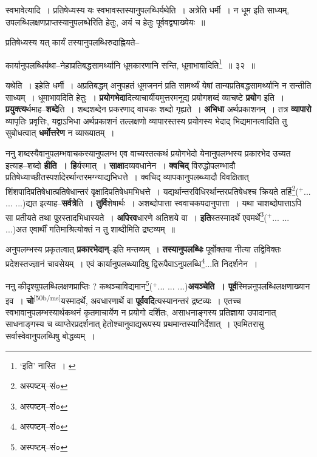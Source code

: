 \documentclass[article,12pt,a4paper]{memoir}
\newcommand{\add}[1]{($^{+}$#1)}
\begin{document}
	स्वभावेत्यादि । प्रतिषेध्यस्य यः स्वभावस्तस्यानुपलब्धिर्यथेति । अत्रेति धर्मी । न धूम इति साध्यम्, उपलब्धिलक्षणप्राप्तस्यानुपलब्धेरिति हेतुः, अयं च हेतुः पूर्ववद्व्याख्येयः ॥ 
	  
	प्रतिषेध्यस्य यत् कार्यं तस्यानुपलब्धिरुदाह्नियते-- 
	  
	कार्यानुपलब्धिर्यथा--नेहाप्रतिबद्धसामर्थ्यानि धूमकारणानि सन्ति, धूमाभावादिति\footnote{‘इति’ नास्ति । \cite{dp-msB} \cite{dp-edP} \cite{dp-edH} \cite{dp-edE} \cite{dp-edN}} ॥ ३२ ॥ 
	  
	यथेति । इहेति धर्मी । अप्रतिबद्धम् अनुपहतं धूमजननं प्रति सामर्थ्यं येषां तान्यप्रतिबद्धसामर्थ्यानि न सन्तीति साध्यम् । धूमाभावदिति हेतुः । \textbf{प्रयोगभेदा}दित्याचार्यीयमुत्तरमनूद्य प्रयोगशब्दं व्याचष्टे \textbf{प्रयो}ग इति । \textbf{प्रयुक्त्य}र्थमाह--\textbf{शब्दे}ति । शब्दशब्देन प्रकरणाद् वाचकः शब्दो गृह्यते । \textbf{अभिधा} अर्थप्रकाशनम् । तत्र \textbf{व्यापारो} व्यापृतिः प्रवृत्तिः, यद्वाऽभिधा अर्थप्रकाशनं तल्लक्षणो व्यापारस्तस्य प्रयोगस्य भेदाद् भिद्यमानत्वादिति तु सुबोधत्वात् \textbf{धर्मोत्तरेण} न व्याख्यातम् ।
	\pend
      

	  \pstart ननु शब्दस्यैवानुपलम्भवाचकस्यानुपलम्भ एव वाच्यस्तत्कथं प्रयोगभेदो येनानुपलम्भस्य प्रकारभेद उच्यत इत्याह--शब्दो \textbf{हीति । हि}र्यस्मात् । \textbf{साक्षा}दव्यवधानेन । \textbf{क्वचिद्} विरुद्धोपलम्भादौ प्रतिषेध्याच्छीतस्पर्शादेरर्थान्तरमग्न्याद्यभिधत्ते । क्वचिद् व्यापकानुपलब्ध्यादौ विवक्षितात् शिंशपादिप्रतिषेधात्प्रतिषेधान्तरं वृक्षादिप्रतिषेधमभिधत्ते । यद्यर्थान्तरविधिरर्थान्तरप्रतिषेधश्च क्रियते तर्हि\footnote{अस्पष्टम्--सं०}\add{... ... ...}द्यत इत्याह--\textbf{सर्वत्रे}ति । \textbf{तुर्वि}शेषार्थः । अशब्दोपात्ता स्ववाचकपदानुपात्ता । यथा चाशब्दोपात्ताऽपि सा प्रतीयते तथा पुरस्तादभिधास्यते । \textbf{अपिरव}धारणे अतिशये वा । \textbf{इति}स्तस्मादर्थे एवमर्थे\footnote{अस्पष्टम्--सं०}\add{... ... ...}अत एवार्थीं गतिमाश्रित्योक्तं न तु शाब्दीमिति द्रष्टव्यम् ॥
	\pend
      

	  \pstart अनुपलम्भस्य प्रकृतत्वात् \textbf{प्रकारभेदान्}--इति मन्तव्यम् । \textbf{तस्यानुपलब्धिः} पूर्वोक्तया नीत्या तद्विविक्तः प्रदेशस्तज्ज्ञानं चावसेयम् । एवं कार्यानुपलब्ध्यादिषु द्विरूपैवाऽनुपलब्धि\footnote{अस्पष्टम्--सं०}...ति निदर्शनेन ।
	\pend
      

	  \pstart ननु कीदृश्युपलब्धिलक्षणप्राप्तिः ? कथञ्चाविद्यमान\footnote{अस्पष्टम्--सं०}\add{... ... ...}\textbf{अयञ्चेति । पूर्व}स्मिन्ननुपलब्धिलक्षणाख्यान इव । \textbf{चो}\leavevmode\textsuperscript{\rmlatinfont\tiny [50b/ms]}यस्मादर्थे, अवधारणार्थे वा \textbf{पूर्ववदि}त्यस्यानन्तरं द्रष्टव्यः । एतच्च स्वभावानुपलम्भस्यार्थकथनं कृतमाचार्येण न प्रयोगो दर्शितः, असाधनाङ्गस्य प्रतिज्ञाया उपादानात् साधनाङ्गस्य च व्याप्तेरप्रदर्शनात् हेतोश्चानुवाद्यरूपस्य प्रथमान्तस्यानिर्देशात् । एवमितरासु सर्वास्वेवानुपलब्धिषु बोद्धव्यम् ।
	\pend
      
\end{document}
